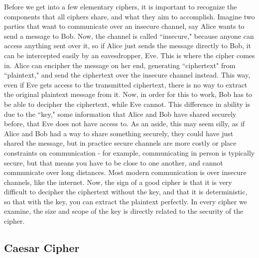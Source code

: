 \documentclass{article}
\begin{document}
Before we get into a few elementary ciphers, it is important to recognize the components that all ciphers share, and what they aim to accomplish. Imagine two parties that want to communicate over an insecure channel, say Alice wants to send a message to Bob. Now, the channel is called ``insecure," because anyone can access anything sent over it, so if Alice just sends the message directly to Bob, it can be intercepted easily by an eavesdropper, Eve. This is where the cipher comes in. Alice can encipher the message on her end, generating ``ciphertext" from ``plaintext," and send the ciphertext over the insecure channel instead. This way, even if Eve gets access to the transmitted ciphertext, there is no way to extract the original plaintext message from it. Now, in order for this to work, Bob has to be able to decipher the ciphertext, while Eve cannot. This difference in ability is due to the ``key," some information that Alice and Bob have shared securely before, that Eve does not have access to. As an aside, this may seem silly, as if Alice and Bob had a way to share something securely, they could have just shared the message, but in practice secure channels are more costly or place constraints on communication - for example, communicating in person is typically secure, but that means you have to be close to one another, and cannot communicate over long distances. Most modern communication is over insecure channels, like the internet. Now, the sign of a good cipher is that it is very difficult to decipher the ciphertext without the key, and that it is deterministic, so that with the key, you can extract the plaintext perfectly. In every cipher we examine, the size and scope of the key is directly related to the security of the cipher.

\subsection{Caesar Cipher}
\end{document}
